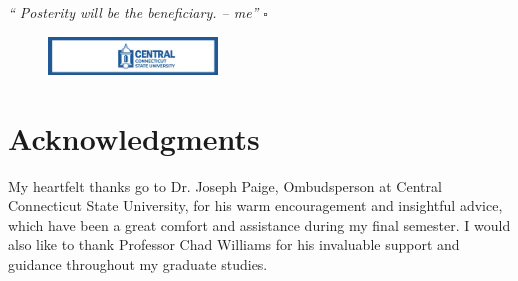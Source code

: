\documentclass[twoside,twocolumn]{article}
\begin{document}
\textit{
\enquote{
Posterity will be the beneficiary. -- me}} 
\hfill
$\square$

































\begin{figure}[h!]
\centering
  \includegraphics[width=0.40\textwidth]{i/iccsu.jpg}
\end{figure}


\vspace{-10mm}

\section*{Acknowledgments}
My heartfelt thanks go to Dr. Joseph Paige,
Ombudsperson at Central Connecticut State University,
for his warm encouragement and insightful advice,
which have been a great comfort and assistance during my final semester.
I would also like to thank Professor Chad Williams for his
invaluable support and guidance throughout my graduate studies.





\fontsize{8}{8}\selectfont
\fontsize{7}{7}\selectfont
\end{document}
